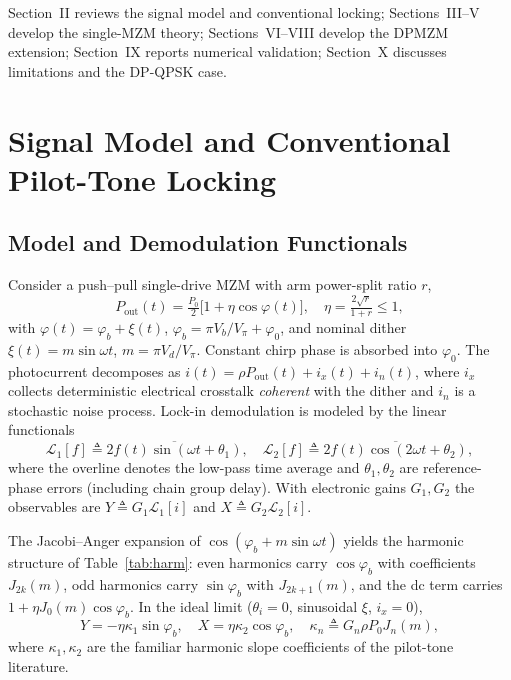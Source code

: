\documentclass[journal]{IEEEtran}
\newcommand{\Lc}{\mathcal{L}}
\begin{document}
Section~II reviews the signal model and conventional locking;
Sections~III--V develop the single-MZM theory; Sections~VI--VIII develop
the DPMZM extension; Section~IX reports numerical validation;
Section~X discusses limitations and the DP-QPSK case.

\section{Signal Model and Conventional Pilot-Tone Locking}
\label{sec:model}

\subsection{Model and Demodulation Functionals}
Consider a push--pull single-drive MZM with arm power-split ratio $r$,
\begin{equation}
P_{\mathrm{out}}(t)=\tfrac{P_0}{2}\bigl[1+\eta\cos\varphi(t)\bigr],\quad
\eta=\tfrac{2\sqrt r}{1+r}\le 1,
\label{eq:mzm}
\end{equation}
with $\varphi(t)=\varphi_b+\xi(t)$,
$\varphi_b=\pi V_b/V_\pi+\varphi_0$, and nominal dither
$\xi(t)=m\sin\omega t$, $m=\pi V_d/V_\pi$. Constant chirp phase is
absorbed into $\varphi_0$. The photocurrent decomposes as
$i(t)=\rho P_{\mathrm{out}}(t)+i_x(t)+i_n(t)$, where $i_x$ collects
deterministic electrical crosstalk \emph{coherent} with the dither and
$i_n$ is a stochastic noise process. Lock-in demodulation is modeled by
the linear functionals
\begin{equation}
\Lc_1[f]\!\triangleq\!\overline{2f(t)\sin(\omega t{+}\theta_1)},\quad
\Lc_2[f]\!\triangleq\!\overline{2f(t)\cos(2\omega t{+}\theta_2)},
\label{eq:lockin}
\end{equation}
where the overline denotes the low-pass time average and
$\theta_1,\theta_2$ are reference-phase errors (including chain group
delay). With electronic gains $G_1,G_2$ the observables are
$Y\triangleq G_1\Lc_1[i]$ and $X\triangleq G_2\Lc_2[i]$.

The Jacobi--Anger expansion of $\cos(\varphi_b+m\sin\omega t)$ yields
the harmonic structure of Table~\ref{tab:harm}: even harmonics carry
$\cos\varphi_b$ with coefficients $J_{2k}(m)$, odd harmonics carry
$\sin\varphi_b$ with $J_{2k+1}(m)$, and the dc term carries
$1+\eta J_0(m)\cos\varphi_b$. In the ideal limit
($\theta_i{=}0$, sinusoidal $\xi$, $i_x{=}0$),
\begin{equation}
Y=-\eta\kappa_1\sin\varphi_b,\quad X=\eta\kappa_2\cos\varphi_b,\quad
\kappa_n\triangleq G_n\rho P_0 J_n(m),
\label{eq:ideal}
\end{equation}
where $\kappa_1,\kappa_2$ are the familiar harmonic slope
coefficients of the pilot-tone literature.
\end{document}

